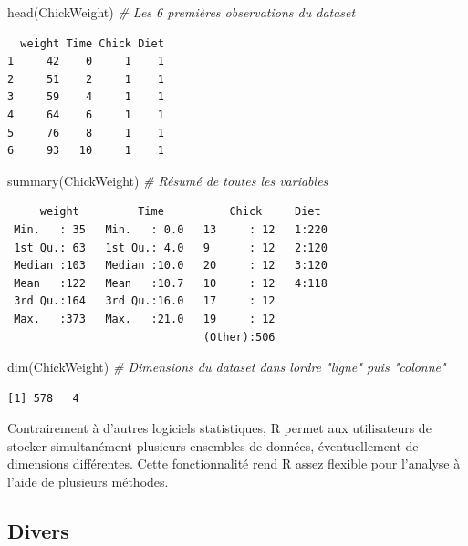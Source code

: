\documentclass[
  12pt,
]{book}
\newenvironment{Shaded}{\begin{snugshade}}{\end{snugshade}}
\newcommand{\CommentTok}[1]{\textcolor[rgb]{0.56,0.35,0.01}{\textit{#1}}}
\newcommand{\FunctionTok}[1]{\textcolor[rgb]{0.00,0.00,0.00}{#1}}
\newcommand{\NormalTok}[1]{#1}
\begin{document}
\begin{Shaded}
\begin{Highlighting}[]
\FunctionTok{head}\NormalTok{(ChickWeight) }\CommentTok{\# Les 6 premières observations du dataset}
\end{Highlighting}
\end{Shaded}

\begin{verbatim}
  weight Time Chick Diet
1     42    0     1    1
2     51    2     1    1
3     59    4     1    1
4     64    6     1    1
5     76    8     1    1
6     93   10     1    1
\end{verbatim}

\begin{Shaded}
\begin{Highlighting}[]
\FunctionTok{summary}\NormalTok{(ChickWeight) }\CommentTok{\# Résumé de toutes les variables}
\end{Highlighting}
\end{Shaded}

\begin{verbatim}
     weight         Time          Chick     Diet   
 Min.   : 35   Min.   : 0.0   13     : 12   1:220  
 1st Qu.: 63   1st Qu.: 4.0   9      : 12   2:120  
 Median :103   Median :10.0   20     : 12   3:120  
 Mean   :122   Mean   :10.7   10     : 12   4:118  
 3rd Qu.:164   3rd Qu.:16.0   17     : 12          
 Max.   :373   Max.   :21.0   19     : 12          
                              (Other):506          
\end{verbatim}

\begin{Shaded}
\begin{Highlighting}[]
\FunctionTok{dim}\NormalTok{(ChickWeight) }\CommentTok{\# Dimensions du dataset dans l\textquotesingle{}ordre "ligne" puis "colonne"}
\end{Highlighting}
\end{Shaded}

\begin{verbatim}
[1] 578   4
\end{verbatim}

Contrairement à d'autres logiciels statistiques, R permet aux utilisateurs de stocker simultanément plusieurs ensembles de données, éventuellement de dimensions différentes. Cette fonctionnalité rend R assez flexible pour l'analyse à l'aide de plusieurs méthodes.

\hypertarget{divers}{%
\subsection{Divers}\label{divers}}
\end{document}
